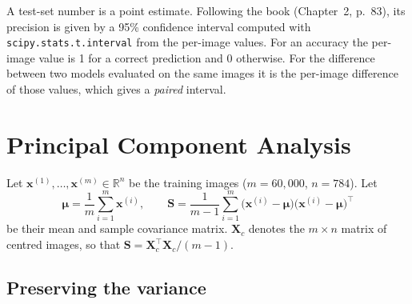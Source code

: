 \documentclass[11pt,a4paper]{article}
\newcommand{\x}{\mathbf{x}}
\newcommand{\X}{\mathbf{X}}
\newcommand{\bmu}{\boldsymbol{\mu}}
\newcommand{\T}{^{\top}}
\begin{document}
A test-set number is a point estimate. Following the book (Chapter~2, p.~83), its precision is given by a 95\% confidence interval computed with \texttt{scipy.stats.t.interval} from the per-image values. For an accuracy the per-image value is 1 for a correct prediction and 0 otherwise. For the difference between two models evaluated on the same images it is the per-image difference of those values, which gives a \emph{paired} interval.

\section{Principal Component Analysis}\label{sec:pca}

Let $\x^{(1)},\dots,\x^{(m)}\in\mathbb{R}^n$ be the training images ($m=60{,}000$, $n=784$). Let
\begin{equation}
\bmu=\frac{1}{m}\sum_{i=1}^{m}\x^{(i)}, \qquad
\mathbf{S}=\frac{1}{m-1}\sum_{i=1}^{m}\big(\x^{(i)}-\bmu\big)\big(\x^{(i)}-\bmu\big)\T
\end{equation}
be their mean and sample covariance matrix. $\X_c$ denotes the $m\times n$ matrix of centred images, so that $\mathbf{S}=\X_c\T\X_c/(m-1)$.

\subsection{Preserving the variance}
\end{document}
